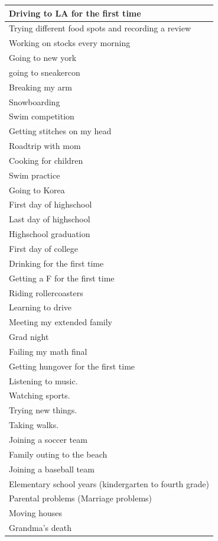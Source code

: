 \documentclass[
  .7em,
  letterpaper,
  DIV=11,
  numbers=noendperiod]{scrartcl}
\begin{document}
\begin{table}
\begin{tabular}{l}
\hline
Driving to LA for the first time\\
\hline
Trying different food spots and recording a review\\
\hline
Working on stocks every morning\\
\hline
Going to new york\\
\hline
going to sneakercon\\
\hline
Breaking my arm\\
\hline
Snowboarding\\
\hline
Swim competition\\
\hline
Getting stitches on my head\\
\hline
Roadtrip with mom\\
\hline
Cooking for children\\
\hline
Swim practice\\
\hline
Going to Korea\\
\hline
First day of highschool\\
\hline
Last day of highschool\\
\hline
Highschool graduation\\
\hline
First day of college\\
\hline
Drinking for the first time\\
\hline
Getting a F for the first time\\
\hline
Riding rollercoasters\\
\hline
Learning to drive\\
\hline
Meeting my extended family\\
\hline
Grad night\\
\hline
Failing my math final\\
\hline
Getting hungover for the first time\\
\hline
Listening to music.\\
\hline
Watching sports.\\
\hline
Trying new things.\\
\hline
Taking walks.\\
\hline
Joining a soccer team\\
\hline
Family outing to the beach\\
\hline
Joining a baseball team\\
\hline
Elementary school years (kindergarten to fourth grade)\\
\hline
Parental problems (Marriage problems)\\
\hline
Moving houses\\
\hline
Grandma's death\\

\end{tabular}
\end{table}
\end{document}
